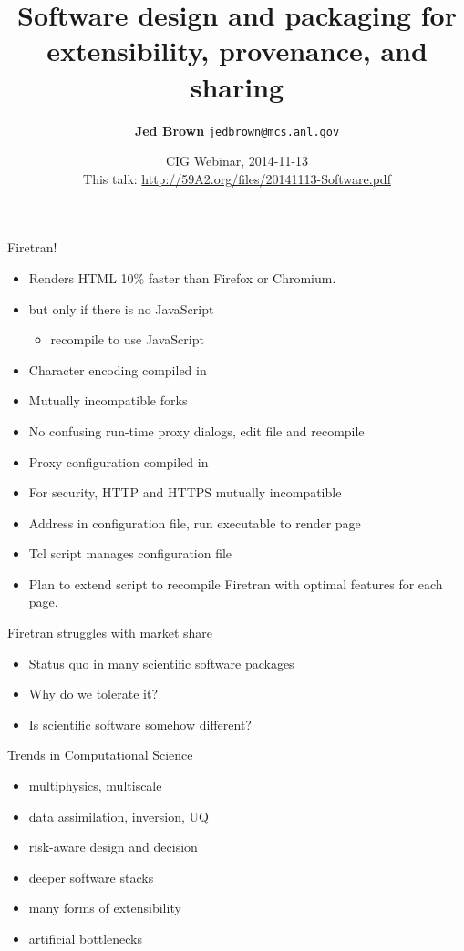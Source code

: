 \documentclass{beamer}
\title{Software design and packaging for extensibility, provenance, and sharing}
\author{{\bf Jed Brown} \texttt{jedbrown@mcs.anl.gov}}
\date{CIG Webinar, 2014-11-13 \\[1em]
This talk: \url{http://59A2.org/files/20141113-Software.pdf}}
\begin{document}
\lstset{language=C}
\normalem

\begin{frame}
  \titlepage
\end{frame}

\begin{frame}{Firetran!}
  \begin{itemize}
  \item Renders HTML 10\% faster than Firefox or Chromium.
  \item<2-> but only if there is no JavaScript
    \begin{itemize}
    \item recompile to use JavaScript
    \end{itemize}
  \item<3-> Character encoding compiled in
  \item<4-> Mutually incompatible forks
  \item<5-> No confusing run-time proxy dialogs, edit file and recompile
  \item<5-> Proxy configuration compiled in
  \item<6-> For security, HTTP and HTTPS mutually incompatible
  \item<7-> Address in configuration file, run executable to render page
  \item<8-> Tcl script manages configuration file
  \item<9-> Plan to extend script to recompile Firetran with optimal features for each page.
  \end{itemize}
\end{frame}

\begin{frame}{Firetran struggles with market share}
  \begin{itemize}
  \item Status quo in many scientific software packages
  \item Why do we tolerate it?
  \item Is scientific software somehow different?
  \end{itemize}
\end{frame}

\begin{frame}{Trends in Computational Science}
  \begin{itemize}
  \item multiphysics, multiscale
  \item data assimilation, inversion, UQ
  \item risk-aware design and decision
  \item deeper software stacks
  \item many forms of extensibility
  \item artificial bottlenecks
  \end{itemize}
\end{frame}
\end{document}
